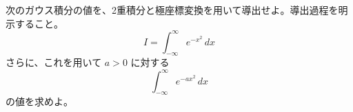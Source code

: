 
次のガウス積分の値を、2重積分と極座標変換を用いて導出せよ。導出過程を明示すること。
\[
I = \int_{-\infty}^{\infty} e^{-x^{2}}\, dx
\]
さらに、これを用いて $a > 0$ に対する
\[
\int_{-\infty}^{\infty} e^{-a x^{2}}\, dx
\]
の値を求めよ。
